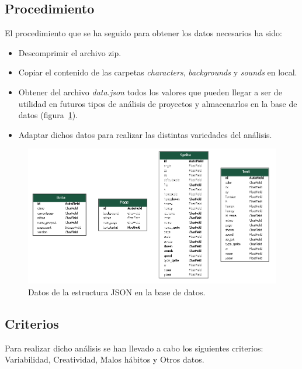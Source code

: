 \documentclass[a4paper, 12pt]{book}
\begin{document}
\clearpage

\subsection{Procedimiento}
\label{subsec:procedimiento}
\vspace{5mm}
El procedimiento que se ha seguido para obtener los datos necesarios ha sido:

\begin{itemize}
    \item Descomprimir el archivo zip.
    \item Copiar el contenido de las carpetas \emph{characters}, \emph{backgrounds} y \emph{sounds} en local.
    \item Obtener del archivo \emph{data.json} todos los valores que pueden llegar a ser de utilidad en futuros tipos de análisis de proyectos y almacenarlos en la base de datos (figura~\ref{fig:bd_json}).
    \item Adaptar dichos datos para realizar las distintas variedades del análisis.
\end{itemize}

\begin{figure}[H]
  \centering
  \includegraphics[width=16cm, keepaspectratio]{img/bd_json.png}
  \caption{Datos de la estructura JSON en la base de datos.}\label{fig:bd_json}
\end{figure}

\newpage
\subsection{Criterios}
\label{subsec:Criterios}

\vspace{5mm}
Para realizar dicho análisis se han llevado a cabo los siguientes criterios: Variabilidad, Creatividad, Malos hábitos y Otros datos.
\end{document}
